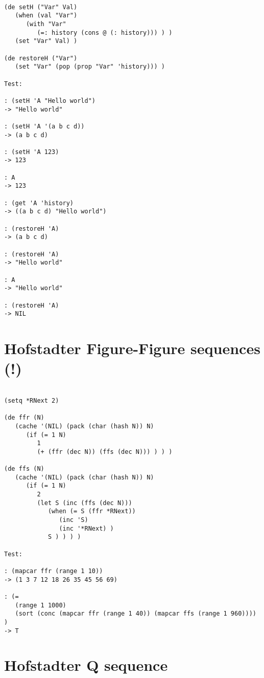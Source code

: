 \begin{verbatim}

(de setH ("Var" Val)
   (when (val "Var")
      (with "Var"
         (=: history (cons @ (: history))) ) )
   (set "Var" Val) )

(de restoreH ("Var")
   (set "Var" (pop (prop "Var" 'history))) )

Test:

: (setH 'A "Hello world")
-> "Hello world"

: (setH 'A '(a b c d))
-> (a b c d)

: (setH 'A 123)
-> 123

: A
-> 123

: (get 'A 'history)
-> ((a b c d) "Hello world")

: (restoreH 'A)
-> (a b c d)

: (restoreH 'A)
-> "Hello world"

: A
-> "Hello world"

: (restoreH 'A)
-> NIL

\end{verbatim}

\section*{Hofstadter Figure-Figure sequences (!)}

\begin{verbatim}

(setq *RNext 2)

(de ffr (N)
   (cache '(NIL) (pack (char (hash N)) N)
      (if (= 1 N)
         1
         (+ (ffr (dec N)) (ffs (dec N))) ) ) )

(de ffs (N)
   (cache '(NIL) (pack (char (hash N)) N)
      (if (= 1 N)
         2
         (let S (inc (ffs (dec N)))
            (when (= S (ffr *RNext))
               (inc 'S)
               (inc '*RNext) )
            S ) ) ) )

Test:

: (mapcar ffr (range 1 10))
-> (1 3 7 12 18 26 35 45 56 69)

: (=
   (range 1 1000)
   (sort (conc (mapcar ffr (range 1 40)) (mapcar ffs (range 1 960)))) )
-> T

\end{verbatim}

\section*{Hofstadter Q sequence}

